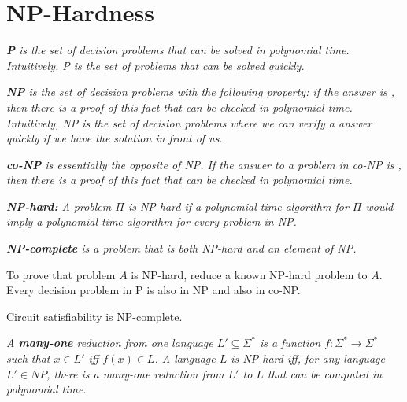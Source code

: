 \section{NP-Hardness}
\emph{\emph{\textbf{P}} is the set of decision problems that can be solved in polynomial time. Intuitively, P is the set of problems that can be solved quickly.}
\linebreak

\emph{\emph{\textbf{NP}} is the set of decision problems with the following property: if the answer is , then there is a \emph{proof} of this fact that can be checked in polynomial time. Intuitively, NP is the set of decision problems where we can verify a  answer quickly if we have the solution in front of us.}
\linebreak

\emph{\emph{\textbf{co-NP}} is essentially the opposite of NP. If the answer to a problem in co-NP is , then there is a proof of this fact that can be checked in polynomial time.}
\linebreak


\emph{\emph{\textbf{NP-hard:}} A problem $\Pi$ is \emph{NP-hard} if a polynomial-time algorithm for $\Pi$ would imply a polynomial-time algorithm for every problem in NP.}
\linebreak

\emph{\emph{\textbf{NP-complete}} is a problem that is both NP-hard and an element of NP.}
\linebreak

To prove that problem $A$ is NP-hard, reduce a known NP-hard problem to $A$.
\\
Every decision problem in P is also in NP and also in co-NP.
\begin{theorem}
	Circuit satisfiability is NP-complete.
\end{theorem}
\emph{A \emph{\textbf{many-one}} reduction from one language $L' \subseteq \Sigma^*$ is a function $f : \Sigma^* \rightarrow \Sigma^*$ such that $x \in L'$ iff $f(x) \in L$. A \emph{language} $L$ is NP-hard iff, for any language $L' \in NP$, there is a \emph{many-one} reduction from $L'$ to $L$ that can be computed in polynomial time.}
\linebreak

